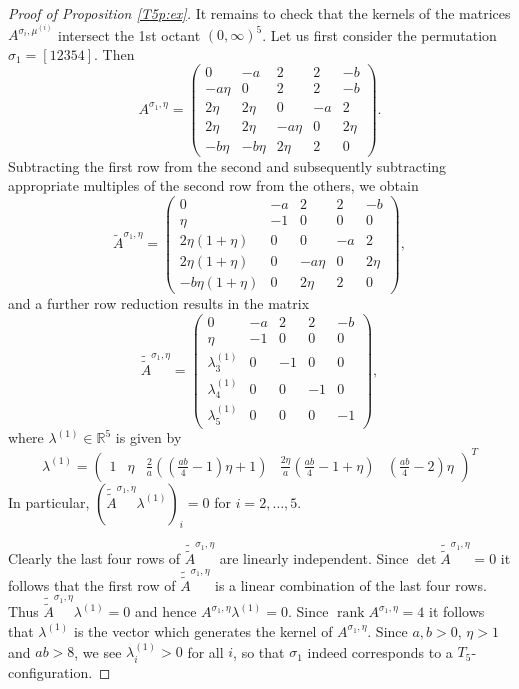 \documentclass[10pt,a4paper]{amsart}
\newcommand{\R}{\mathbb{R}}
\newcommand{\rank}{\operatorname{rank}}
\begin{document}
\begin{proof}[Proof of Proposition \ref{T5p:ex}]
It remains to check that the kernels of the matrices $A^{\sigma_i,\mu^{(i)}}$ intersect the 1st octant $(0,\infty)^5$.
 Let us first consider the permutation $\sigma_1=[1 2 3 5 4]$. Then 
$$
A^{\sigma_1,\eta}=\begin{pmatrix}
	0&-a&2&2&-b\\ -a\eta &0&2&2&-b \\ 2\eta &2\eta &0&-a&2\\ 2\eta &2\eta &-a\eta &0&2\eta\\-b\eta &-b\eta &2\eta &2 &0
\end{pmatrix}.	
$$ 
Subtracting the first row from the second and subsequently subtracting appropriate multiples of the second row from the others, we obtain
$$
\tilde A^{\sigma_1,\eta}=\begin{pmatrix}
	0&-a&2&2&-b\\ 
	\eta &-1&0&0&0\\ 
	2\eta(1+\eta) &0&0&-a&2\\ 
	2\eta(1+\eta) &0&-a\eta &0&2\eta\\
	-b\eta(1+\eta) &0 &2\eta &2 &0
\end{pmatrix},
$$ 
and a further row reduction results in the matrix
$$
  \tilde{ \tilde A}^{\sigma_1, \eta}  = \begin{pmatrix}
	0&-a&2&2&-b\\ 
	\eta &-1&0&0&0\\ 
	\lambda^{(1)}_3 &0&-1&0&0\\ 
	\lambda^{(1)}_4 &0&0&-1&0\\
	\lambda^{(1)}_5 &0 &0&0&-1
\end{pmatrix},
$$ 
where $\lambda^{(1)}\in \R^5$ is given by
$$
\lambda^{(1)}=\begin{pmatrix}1&\eta &\tfrac{2}{a}\left((\tfrac{ab}{4}-1)\eta+1\right)&\tfrac{2\eta}{a}\left(\tfrac{ab}{4}-1+\eta\right)&\left(\frac{ab}{4}-2\right)\eta\end{pmatrix}^T
$$ 
In particular, $( \tilde {\tilde A}^{\sigma_1,\eta}\lambda^{(1)})_i=0$ for $i=2,\dots,5$.

Clearly the last four rows of $\tilde {\tilde A}^{\sigma_1,\eta}$
are linearly independent. Since $\det \tilde {\tilde A}^{\sigma_1,\eta} = 0$
it follows that the first row of $\tilde {\tilde A}^{\sigma_1,\eta}$ is a linear combination
of the last four rows. Thus $\tilde {\tilde A}^{\sigma_1,\eta} \lambda^{(1)} = 0$
and hence $A^{\sigma_1, \eta} \lambda^{(1)} = 0$. Since $\rank A^{\sigma_1, \eta} = 4$ it follows that $\lambda^{(1)}$ is the vector which generates the kernel of 
$ A^{\sigma_1, \eta} $. 
Since $a,b>0$, $\eta>1$ and $ab>8$, we see $\lambda^{(1)}_i>0$ for all $i$, so that $\sigma_1$ indeed corresponds to a $T_5$-configuration.



\end{proof}
\end{document}
